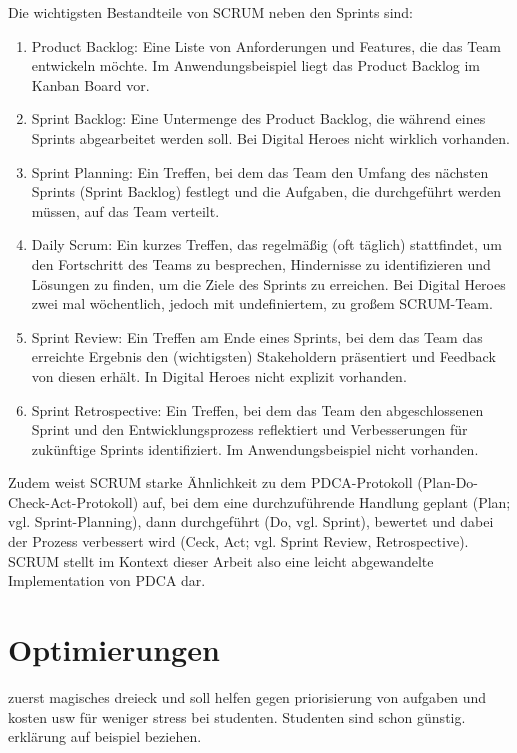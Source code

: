Die wichtigsten Bestandteile von SCRUM neben den Sprints sind:
\begin{enumerate}
\item Product Backlog: Eine Liste von Anforderungen und Features, die das Team entwickeln möchte. 
Im Anwendungsbeispiel liegt das Product Backlog im Kanban Board vor. 
\item Sprint Backlog: Eine Untermenge des Product Backlog, die während eines Sprints abgearbeitet werden soll.
Bei Digital Heroes nicht wirklich vorhanden.
\item Sprint Planning: Ein Treffen, bei dem das Team den Umfang des nächsten Sprints (Sprint Backlog) festlegt
und die Aufgaben, die durchgeführt werden müssen, auf das Team verteilt.
\item Daily Scrum: Ein kurzes Treffen, das regelmäßig (oft täglich) stattfindet, 
um den Fortschritt des Teams zu besprechen, 
Hindernisse zu identifizieren und Lösungen zu finden, um die Ziele des Sprints zu erreichen.
Bei Digital Heroes zwei mal wöchentlich, jedoch mit undefiniertem, zu großem SCRUM-Team. 
\item Sprint Review: Ein Treffen am Ende eines Sprints,
bei dem das Team das erreichte Ergebnis den (wichtigsten) Stakeholdern präsentiert 
und Feedback von diesen erhält. In Digital Heroes nicht explizit vorhanden. 
\item Sprint Retrospective: Ein Treffen, bei dem das Team den abgeschlossenen Sprint 
und den Entwicklungsprozess reflektiert und Verbesserungen für zukünftige Sprints identifiziert.
Im Anwendungsbeispiel nicht vorhanden.
\end{enumerate}

Zudem weist SCRUM starke Ähnlichkeit zu dem PDCA-Protokoll (Plan-Do-Check-Act-Protokoll) auf, 
bei dem eine durchzuführende Handlung geplant (Plan; vgl. Sprint-Planning), 
dann durchgeführt (Do, vgl. Sprint), bewertet und dabei der Prozess verbessert wird 
(Ceck, Act; vgl. Sprint Review, Retrospective). SCRUM stellt im Kontext dieser Arbeit also eine 
leicht abgewandelte Implementation von PDCA dar. 


\section{Optimierungen}



zuerst magisches dreieck und soll helfen gegen priorisierung von aufgaben und kosten usw
für weniger stress bei studenten. Studenten sind schon günstig. erklärung auf beispiel beziehen.